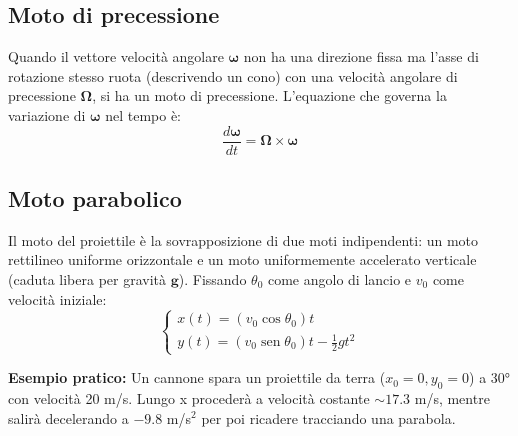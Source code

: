 \documentclass[12pt]{article}
\begin{document}
\subsection*{Moto di precessione}
Quando il vettore velocità angolare $\boldsymbol{\omega}$ non ha una direzione fissa ma l'asse di rotazione stesso ruota (descrivendo un cono) con una velocità angolare di precessione $\boldsymbol{\Omega}$, si ha un moto di precessione. L'equazione che governa la variazione di $\boldsymbol{\omega}$ nel tempo è:
\begin{equation}
\frac{d\boldsymbol{\omega}}{dt} = \boldsymbol{\Omega} \times \boldsymbol{\omega}
\end{equation}

\vspace{0.3cm}
\begin{center}
\end{center}
\vspace{0.3cm}

\subsection*{Moto parabolico}
Il moto del proiettile è la sovrapposizione di due moti indipendenti: un moto rettilineo uniforme orizzontale e un moto uniformemente accelerato verticale (caduta libera per gravità $\mathbf{g}$). Fissando $\theta_0$ come angolo di lancio e $v_0$ come velocità iniziale:
\begin{equation}
\begin{cases}
x(t) = (v_0 \cos\theta_0) t \\
y(t) = (v_0 \operatorname{sen}\theta_0) t - \frac{1}{2}gt^2
\end{cases}
\end{equation}

\textbf{Esempio pratico:} Un cannone spara un proiettile da terra ($x_0=0, y_0=0$) a 30° con velocità 20 m/s. Lungo x procederà a velocità costante $\sim 17.3$ m/s, mentre salirà decelerando a $-9.8$ m/s$^2$ per poi ricadere tracciando una parabola.
\end{document}
